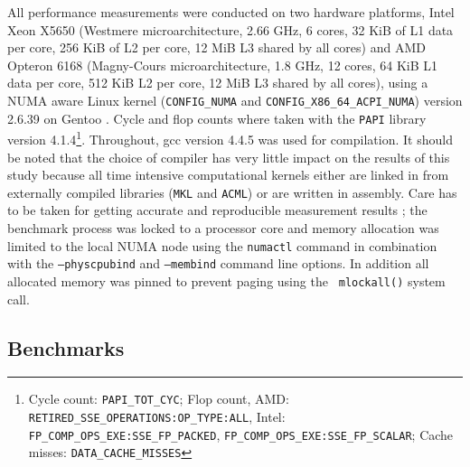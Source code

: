 All performance measurements were conducted on two hardware platforms, Intel
Xeon X5650 (Westmere microarchitecture, 2.66 GHz, 6 cores, 32 KiB of L1 data
per core, 256 KiB of L2 per core, 12 MiB L3 shared by all cores) and AMD
Opteron 6168 (Magny-Cours microarchitecture, 1.8 GHz, 12 cores, 64 KiB L1 data
per core, 512 KiB L2 per core, 12 MiB L3 shared by all cores), using a NUMA
aware Linux kernel ({\tt CONFIG\_NUMA} and {\tt CONFIG\_X86\_64\_ACPI\_NUMA})
version 2.6.39 on Gentoo \cite{gentoo}.  Cycle and flop counts where taken
with the {\tt PAPI} library \cite{papi, Mucci99papi:a, 5936277} version
4.1.4\footnote{Cycle count: {\tt PAPI\_TOT\_CYC}; Flop count, AMD: {\tt
RETIRED\_SSE\_OPERATIONS:OP\_TYPE:ALL}, Intel: {\tt
FP\_COMP\_OPS\_EXE:SSE\_FP\_PACKED}, {\tt FP\_COMP\_OPS\_EXE:SSE\_FP\_SCALAR};
Cache misses: {\tt DATA\_CACHE\_MISSES}}. Throughout, gcc \cite{gcc} version
4.4.5 was used for compilation. It should be noted that the choice of compiler
has very little impact on the results of this study because all time intensive
computational kernels either are linked in from externally compiled libraries
({\tt MKL} and {\tt ACML}) or are written in assembly.  Care has to be taken
for getting accurate and reproducible measurement results \cite{Weaver2008};
the benchmark process was locked to a processor core and memory allocation was
limited to the local NUMA node using the {\tt numactl} command in combination
with the {\tt --physcpubind} and {\tt --membind} command line options. In
addition all allocated memory was pinned to prevent paging using the {\tt
mlockall()} system call.

\subsection{Benchmarks}
\label{sec:benchmarks}

